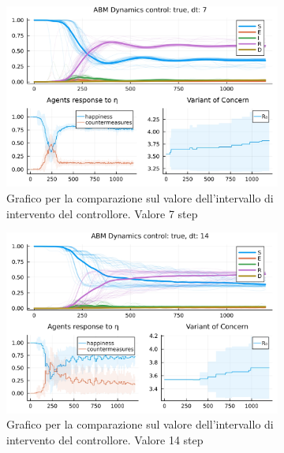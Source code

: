\begin{figure}[H]
	\centering
	\begin{subfigure}[b]{0.45\textwidth}
		\centering
		\includegraphics[width=\textwidth]{img/SocialNetworkABM_1_DT.jpg}
		\caption{Grafico per la comparazione sul valore dell'intervallo di intervento del controllore. Valore 7 step}
		\label{fig:comparison_dt_7}
	\end{subfigure}
	\hfill
	\begin{subfigure}[b]{0.45\textwidth}
		\centering
		\includegraphics[width=\textwidth]{img/SocialNetworkABM_2_DT.jpg}
		\caption{Grafico per la comparazione sul valore dell'intervallo di intervento del controllore. Valore 14 step}
		\label{fig:comparison_dt_14}
	\end{subfigure}
	\hfill
	\begin{subfigure}[b]{0.45\textwidth}
		\centering

\end{subfigure}
\end{figure}
